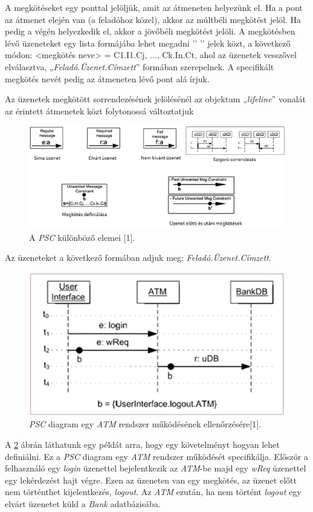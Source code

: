 A megkötéseket egy ponttal jelöljük, amit az átmeneten helyezünk el.
Ha a pont az átmenet elején van (a feladóhoz közel), akkor az múltbéli megkötést jelöl.
Ha pedig a végén helyezkedik el, akkor a jövőbéli megkötést jelöli.
A megkötésben lévő üzeneteket egy lista formájába lehet megadni ’{’ ’}’ jelek közt, a következő módon: <megkötés neve> = {C1.I1.Cj, ..., Ck.In.Ct}, ahol az üzenetek vesszővel elválasztva, „\textit{Feladó.Üzenet.Címzett}” formában szerepelnek.
A specifikált megkötés nevét pedig az átmeneten lévő pont alá írjuk.

Az üzenetek megkötött sorrendezésének jelölésénél az objektum „\textit{lifeline}” vonalát az érintett átmenetek közt folytonossá változtatjuk

\begin{figure}[!ht]
    \centering
    \includegraphics[width=150mm, keepaspectratio]{figures/2abra.png}
    \caption{A \textit{PSC} különböző elemei [1].}
    \label{psc_elemek}
\end{figure}

Az üzeneteket a következő formában adjuk meg: \textit{Feladó.Üzenet.Címzett}.

\begin{figure}[!ht]
    \centering
    \includegraphics[width=130mm, keepaspectratio]{figures/3abra.png}
    \caption{\textit{PSC} diagram egy \textit{ATM} rendszer működésének ellenőrzésére[1].}
    \label{psc_példa}
\end{figure}
A \ref{psc_példa} ábrán láthatunk egy példát arra, hogy egy követelményt hogyan lehet definiálni.
Ez a \textit{PSC} diagram egy \textit{ATM} rendszer működését specifikálja.
Először a felhasználó egy \textit{login} üzenettel bejelentkezik az \textit{ATM}-be majd egy \textit{wReq} üzenettel egy lekérdezést hajt végre.
Ezen az üzeneten van egy megkötés, az üzenet előtt nem történthet kijelentkezés, \textit{logout}.
Az \textit{ATM} ezután, ha nem történt \textit{logout} egy elvárt üzenetet küld a \textit{Bank} adatbázisába.

